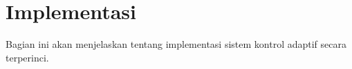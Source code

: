 \section{Implementasi}

Bagian ini akan menjelaskan tentang implementasi sistem kontrol adaptif secara terperinci.








% 
% 
% 
% 
% 





